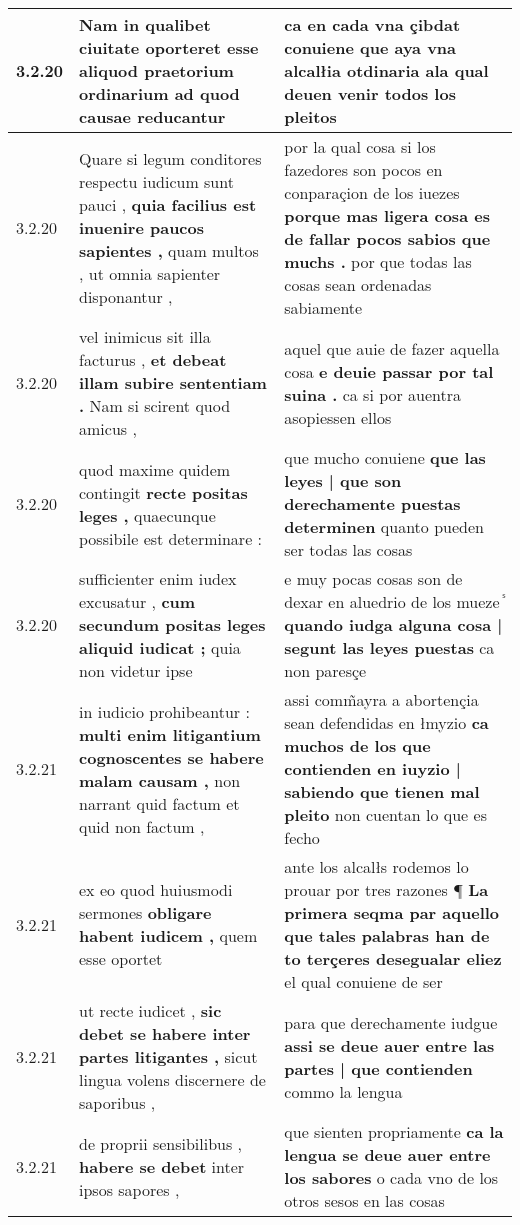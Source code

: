 \begin{tabular}{|p{1cm}|p{6.5cm}|p{6.5cm}|}
3.2.20 & Nam in qualibet ciuitate oporteret \textbf{ esse aliquod praetorium ordinarium } ad quod causae reducantur & ca en cada vna çibdat conuiene \textbf{ que aya vna alcalłia otdinaria } ala qual deuen venir todos los pleitos \\\hline
3.2.20 & Quare si legum conditores respectu iudicum sunt pauci , \textbf{ quia facilius est inuenire paucos sapientes , } quam multos , ut omnia sapienter disponantur , & por la qual cosa si los fazedores son pocos en conparaçion de los iuezes \textbf{ porque mas ligera cosa es de fallar pocos sabios que muchs . } por que todas las cosas sean ordenadas sabiamente \\\hline
3.2.20 & vel inimicus sit illa facturus , \textbf{ et debeat illam subire sententiam . } Nam si scirent quod amicus , & aquel que auie de fazer aquella cosa \textbf{ e deuie passar por tal suina . } ca si por auentra asopiessen ellos \\\hline
3.2.20 & quod maxime quidem contingit \textbf{ recte positas leges , } quaecunque possibile est determinare : & que mucho conuiene \textbf{ que las leyes | que son derechamente puestas determinen } quanto pueden ser todas las cosas \\\hline
3.2.20 & sufficienter enim iudex excusatur , \textbf{ cum secundum positas leges aliquid iudicat ; } quia non videtur ipse & e muy pocas cosas son de dexar en aluedrio de los mueze ᷤ \textbf{ quando iudga alguna cosa | segunt las leyes puestas } ca non paresçe \\\hline
3.2.21 & in iudicio prohibeantur : \textbf{ multi enim litigantium cognoscentes se habere malam causam , } non narrant quid factum et quid non factum , & assi comm̃ayra a abortençia sean defendidas en łmyzio \textbf{ ca muchos de los que contienden en iuyzio | sabiendo que tienen mal pleito } non cuentan lo que es fecho \\\hline
3.2.21 & ex eo quod huiusmodi sermones \textbf{ obligare habent iudicem , } quem esse oportet & ante los alcalłs rodemos lo prouar por tres razones ¶ \textbf{ La primera seqma par aquello que tales palabras han de to terçeres desegualar eliez } el qual conuiene de ser \\\hline
3.2.21 & ut recte iudicet , \textbf{ sic debet se habere inter partes litigantes , } sicut lingua volens discernere de saporibus , & para que derechamente iudgue \textbf{ assi se deue auer entre las partes | que contienden } commo la lengua \\\hline
3.2.21 & de proprii sensibilibus , \textbf{ habere se debet } inter ipsos sapores , & que sienten propriamente \textbf{ ca la lengua se deue auer entre los sabores } o cada vno de los otros sesos en las cosas \\\hline

\end{tabular}
